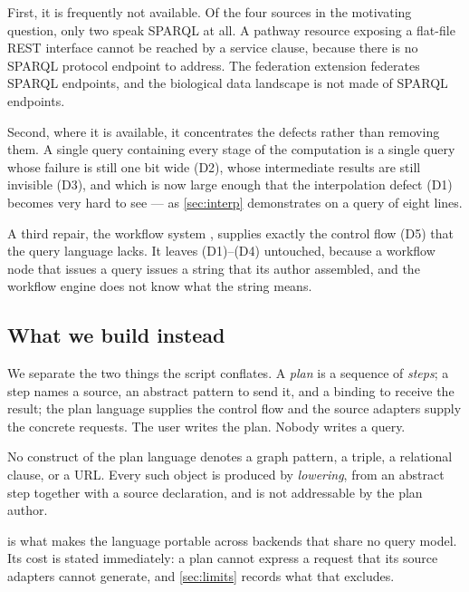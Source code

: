 First, it is frequently not available. Of the four sources in the motivating
question, only two speak SPARQL at all. A pathway resource exposing a flat-file
REST interface \citep{Kanehisa2000,Kanehisa2023} cannot be reached by a service
clause, because there is no SPARQL protocol endpoint to address. The federation
extension federates SPARQL endpoints, and the biological data landscape is not
made of SPARQL endpoints.

Second, where it is available, it concentrates the defects rather than removing
them. A single query containing every stage of the computation is a single
query whose failure is still one bit wide (D2), whose intermediate results are
still invisible (D3), and which is now large enough that the interpolation
defect (D1) becomes very hard to see --- as \cref{sec:interp} demonstrates on a
query of eight lines.

A third repair, the workflow system \citep{Wolstencroft2013,Koster2012,Berthold2009},
supplies exactly the control flow (D5) that the query language lacks. It leaves
(D1)--(D4) untouched, because a workflow node that issues a query issues a
string that its author assembled, and the workflow engine does not know what
the string means.

\subsection{What we build instead}

We separate the two things the script conflates. A \emph{plan} is a sequence of
\emph{steps}; a step names a source, an abstract pattern to send it, and a
binding to receive the result; the plan language supplies the control flow and
the source adapters supply the concrete requests. The user writes the plan.
Nobody writes a query.

\begin{principle}
\label{prin:leaves}
No construct of the plan language denotes a graph pattern, a triple, a
relational clause, or a URL. Every such object is produced by \emph{lowering},
from an abstract step together with a source declaration, and is not
addressable by the plan author.
\end{principle}

 is what makes the language portable across backends that
share no query model. Its cost is stated immediately: a plan cannot express a
request that its source adapters cannot generate, and \cref{sec:limits} records
what that excludes.

